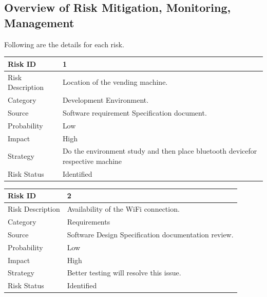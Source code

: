 \documentclass[oneside,a4paper,12pt]{report}
\begin{document}
\subsection{Overview of Risk Mitigation, Monitoring, Management}


Following are the details for each risk.
\begin{table}[!htbp]
\begin{center}
\def\arraystretch{1.5}
\begin{tabularx}{\textwidth}{| l | X |}
\hline 
Risk ID	& 1 \\ \hline
Risk Description	& Location of the vending machine.\\ \hline
Category	& Development Environment. \\ \hline
Source	& Software requirement Specification document. \\ \hline
Probability	& Low \\ \hline
Impact	& High \\ \hline
Strategy &Do the environment study and then place bluetooth devicefor respective machine \\ \hline
Risk Status	& Identified \\ \hline
\end{tabularx}
\end{center}
\label{tab:risk1}
\end{table}

\begin{table}[!htbp]
\begin{center}
\def\arraystretch{1.5}
\begin{tabularx}{\textwidth}{| l | X |}
\hline 
Risk ID	& 2 \\ \hline
Risk Description	& Availability of the WiFi connection.\\ \hline
Category	& Requirements \\ \hline
Source	& Software Design Specification documentation review. \\ \hline
Probability	& Low \\ \hline
Impact	& High \\ \hline
Strategy	& Better testing will resolve this issue.  \\ \hline
Risk Status	& Identified \\ \hline
\end{tabularx}
\end{center}
\label{tab:risk2}
\end{table}
\newpage
\end{document}
